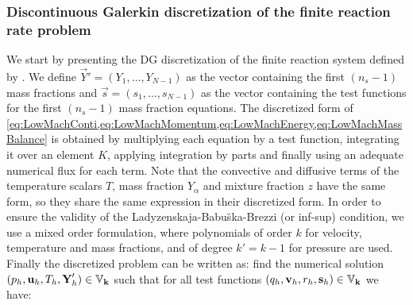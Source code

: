 












\subsubsection{Discontinuous Galerkin discretization of the finite reaction rate problem}
We start by presenting the DG discretization of the finite reaction system defined by . We define $\vec{Y}' = \left(Y_1,\dots,Y_{N-1}\right)$ as the vector containing the first $(n_s-1)$ mass fractions and $\vec{s} = \left(s_1, \dots, s_{N-1} \right)$ as the vector containing the test functions for the first $(n_s-1)$  mass fraction equations. The discretized form of \cref{eq:LowMachConti,eq:LowMachMomentum,eq:LowMachEnergy,eq:LowMachMassBalance} is obtained by multiplying each equation by a test function, integrating it over an element $K$, applying integration by parts and finally using an adequate numerical flux for each term. Note that the convective and diffusive terms of the temperature scalars $T$, mass fraction $Y_\alpha$ and mixture fraction $z$ have the same form, so they share the same expression in their discretized form.
In order to ensure the validity  of the  Ladyzenskaja-Babu\u{s}ka-Brezzi (or inf-sup) condition, \cite{babuskaFiniteElementMethod1973} we use a mixed order formulation, where polynomials of order $k$ for velocity, temperature and mass fractions, and of degree $k' = k-1$ for pressure are used.  Finally the discretized problem can be written as: find the numerical solution $(p_h,\textbf{u}_h, T_h, \textbf{Y}'_h) \in \mathbb{V}_{\textbf{k}}$ such that for all test functions $(q_h,\textbf{v}_h, r_h, \mathbf{s}_h) \in \mathbb{V}_{\textbf{k}}$ we have:
